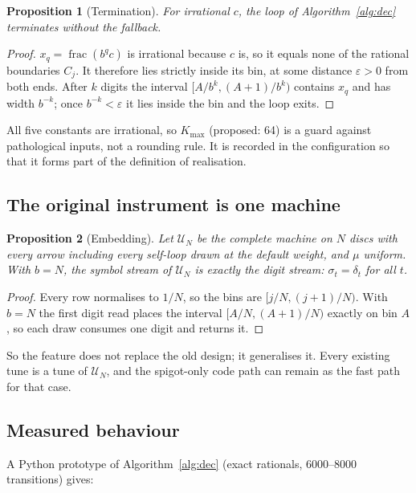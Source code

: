 \documentclass[11pt,a4paper]{article}
\newcommand{\frc}{\operatorname{frac}}
\theoremstyle{definition}
\theoremstyle{plain}
\newtheorem{proposition}{Proposition}
\theoremstyle{remark}
\begin{document}
\begin{proposition}[Termination]
For irrational $c$, the loop of Algorithm~\ref{alg:dec} terminates without the fallback.
\end{proposition}
\begin{proof}
$x_q=\frc(b^qc)$ is irrational because $c$ is, so it equals none of the rational boundaries $C_j$.
It therefore lies strictly inside its bin, at some distance $\varepsilon>0$ from both ends. After
$k$ digits the interval $[A/b^k,(A+1)/b^k)$ contains $x_q$ and has width $b^{-k}$; once
$b^{-k}<\varepsilon$ it lies inside the bin and the loop exits.
\end{proof}

All five constants are irrational, so $K_{\max}$ (proposed: 64) is a guard against pathological
inputs, not a rounding rule. It is recorded in the configuration so that it forms part of the
definition of realisation.

\subsection{The original instrument is one machine}

\begin{proposition}[Embedding]
\label{prop:embedding}
Let $\mathcal{U}_N$ be the complete machine on $N$ discs with every arrow including every self-loop
drawn at the default weight, and $\mu$ uniform. With $b=N$, the symbol stream of $\mathcal{U}_N$ is
exactly the digit stream: $\sigma_t=\delta_t$ for all $t$.
\end{proposition}
\begin{proof}
Every row normalises to $1/N$, so the bins are $[j/N,(j+1)/N)$. With $b=N$ the first digit read
places the interval $[A/N,(A+1)/N)$ exactly on bin $A$, so each draw consumes one digit and returns
it.
\end{proof}

So the feature does not replace the old design; it generalises it. Every existing tune is a tune of
$\mathcal{U}_N$, and the spigot-only code path can remain as the fast path for that case.

\subsection{Measured behaviour}

A Python prototype of Algorithm~\ref{alg:dec} (exact rationals, 6000--8000 transitions) gives:
\end{document}
